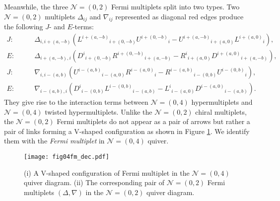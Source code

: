 \documentclass{article}
\numberwithin{equation}{section}
\begin{document}
Meanwhile, the three $\mathcal{N}=(0,2)$ Fermi multiplets split into two types. 
Two $\mathcal{N}=(0,2)$ multiplets $\Delta_{ij}$ and $\nabla_{ij}$ represented as 
diagonal red edges produce the following $J$- and $E$-terms: 
\begin{align}
\label{je_bifund}
J:\qquad & 
\Delta_{i,i+(a,-b)}\left(
{L^{i+(a,-b)}}_{i+(0,-b)}{U^{i+(0,-b)}}_{i}
-{U^{i+(a,-b)}}_{i+(a,0)}{L^{i+(a,0)}}_{i}
\right),
\nonumber\\
E:\qquad &
\Delta_{i+(a,-b),i}
\left(
{D^{i}}_{i+(0,-b)}{R^{i+(0,-b)}}_{i+(a,-b)}
-{R^{i}}_{i+(a,0)}{D^{i+(a,0)}}_{i+(a,-b)}
\right),
\nonumber\\
J:\qquad &
\nabla_{i,i-(a,b)}\left(
{U^{i-(a,b)}}_{i-(a,0)}{R^{i-(a,0)}}_{i}
-{R^{i-(a,b)}}_{i-(0,b)}{U^{i-(0,b)}}_{i}
\right),
\nonumber\\
E:\qquad &
\nabla_{i-(a,b),i}
\left(
{D^{i}}_{i-(0,b)}{L^{i-(0,b)}}_{i-(a,b)}
-{L^{i}}_{i-(a,0)}{D^{i-(a,0)}}_{i-(a,b)}
\right). 
\end{align}
They give rise to the interaction terms between $\mathcal{N}=(0,4)$ hypermultiplets 
and $\mathcal{N}=(0,4)$ twisted hypermultiplets. 
Unlike the $\mathcal{N}=(0,2)$ chiral multiplets, 
the $\mathcal{N}=(0,2)$ Fermi multiplets do not appear as a pair of arrows 
but rather a pair of links forming a V-shaped configuration as shown in Figure \ref{fig04fm_dec}. 
We identify them with the \textit{Fermi multiplet} in $\mathcal{N}=(0,4)$ quiver. 
\begin{figure}
\begin{center}
\texttt{[image: fig04fm\_dec.pdf]}
\caption{
(i) A V-shaped configuration of Fermi multiplet in the $\mathcal{N}=(0,4)$ quiver diagram. 
(ii) The corresponding pair of $\mathcal{N}=(0,2)$ Fermi multiplets $(\Delta, \nabla)$ in the $\mathcal{N}=(0,2)$ quiver diagram.}
\label{fig04fm_dec}
\end{center}
\end{figure}
\end{document}
